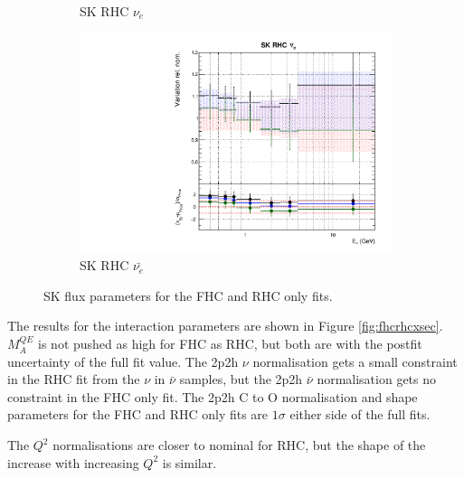 \begin{figure}
\begin{subfigure}{0.45\textwidth}
  \caption{SK RHC $\nu_{e}$}
\end{subfigure}
\begin{subfigure}{0.45\textwidth}
  \centering
  \includegraphics[width=0.75\linewidth]{figs/fhcrhcfitsflux_15}
  \caption{SK RHC $\bar{\nu_e}$}
\end{subfigure}
\caption{SK flux parameters for the FHC and RHC only fits.}
\label{fig:fhcrhcfluxSK}
\end{figure}

The results for the interaction parameters are shown in Figure \ref{fig:fhcrhcxsec}. $M_{A}^{QE}$ is not pushed as high for FHC as RHC, but both are with the postfit uncertainty of the full fit value. The 2p2h $\nu$ normalisation gets a small constraint in the RHC fit from the $\nu$ in $\bar{\nu}$ samples, but the 2p2h $\bar{\nu}$ normalisation gets no constraint in the FHC only fit. The 2p2h C to O normalisation and shape parameters for the FHC and RHC only fits are $1\sigma$ either side of the full fits. 

The $Q^2$ normalisations are closer to nominal for RHC, but the shape of the increase with increasing $Q^2$ is similar. 


